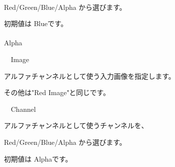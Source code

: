 \documentclass[a4paper,12pt]{article}
\begin{document}
\newpage

\thispagestyle{empty}

\ \vspace{-0.2em}
\par
Red/Green/Blue/Alpha から選びます。\par
初期値は Blueです。\\
\\
Alpha\par
\noindent \ \, Image\par
アルファチャンネルとして使う入力画像を指定します。\par
その他は"Red Image"と同じです。\\
\par
\noindent \ \, Channel\par
アルファチャンネルとして使うチャンネルを、\par
Red/Green/Blue/Alpha から選びます。\par
初期値は Alphaです。
\end{document}
